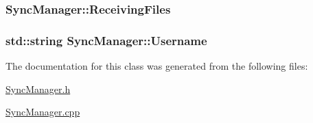 \hypertarget{classSyncManager_a9b648f73183f6974ae10f469fbfdee6a}{
\subsubsection[{Receiving\-Files}]{ Sync\-Manager\-::\-Receiving\-Files\hspace{0.3cm}{\ttfamily [private]}}}\label{classSyncManager_a9b648f73183f6974ae10f469fbfdee6a}
\hypertarget{classSyncManager_a2c3c7d8f256ef22bac4611da1a6f495a}{
\subsubsection[{Username}]{\setlength{\rightskip}{0pt plus 5cm}std\-::string Sync\-Manager\-::\-Username\hspace{0.3cm}{\ttfamily [private]}}}\label{classSyncManager_a2c3c7d8f256ef22bac4611da1a6f495a}


The documentation for this class was generated from the following files\-:\begin{DoxyCompactItemize}
\item 
\hyperlink{SyncManager_8h}{Sync\-Manager.\-h}\item 
\hyperlink{SyncManager_8cpp}{Sync\-Manager.\-cpp}\end{DoxyCompactItemize}
